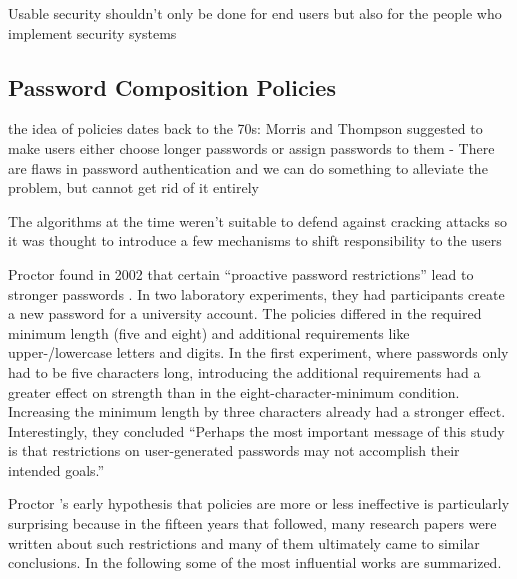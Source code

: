 Usable security shouldn't only be done for end users but also for the people who implement security systems \cite{Acar2016NotYourDeveloper}


	\subsection{Password Composition Policies}\label{sec:rw:policies}
	
	
	
	
	the idea of policies dates back to the 70s: Morris and Thompson suggested to make users
	either choose longer passwords or assign passwords to them - There are flaws in password authentication and we can do something to alleviate the problem, but cannot get rid of it entirely \cite{Morris1979PasswordSecurity}
	
	The algorithms at the time weren't suitable to defend against cracking attacks so it was thought to introduce a few mechanisms to shift responsibility to the users \cite{Feldmeier1990UnixPasswordSecurity}
	



	Proctor \etal found in 2002 that certain ``proactive password restrictions'' lead to stronger passwords \cite{Proctor2002ImprovingAuthenticationProactivePasswordRestrictions}. In two laboratory experiments, they had participants create a new password for a university account. The policies differed in the required minimum length (five and eight) and additional requirements like upper-/lowercase letters and digits. In the first experiment, where passwords only had to be five characters long, introducing the additional requirements had a greater effect on strength than in the eight-character-minimum condition. Increasing the minimum length by three characters already had a stronger effect. Interestingly, they concluded ``Perhaps the most important message of this study is that restrictions on user-generated passwords may not accomplish their intended goals.'' 
	
	
	Proctor \etal's early hypothesis that policies are more or less ineffective is particularly surprising because in the fifteen years that followed, many research papers were written about such restrictions and many of them ultimately came to similar conclusions. In the following some of the most influential works are summarized.
	

